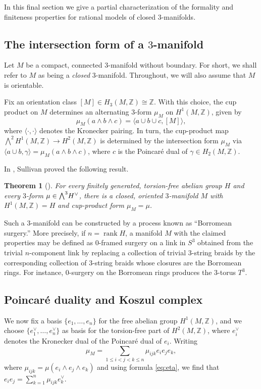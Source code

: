 \documentclass{article}
\numberwithin{equation}{section}
\newtheorem{theorem}{Theorem}[section]
\theoremstyle{definition}
\newcommand{\Z}{\mathbb{Z}}
\DeclareMathOperator{\rank}{rank}
\newcommand{\bwedge}{\mbox{\normalsize $\bigwedge$}}
\begin{document}
In this final section we give a partial characterization of the formality 
and finiteness properties for rational models of closed $3$-manifolds.

\subsection{The intersection form of a $3$-manifold}
\label{subsec:coho 3-mfd}

Let $M$ be a compact, connected $3$-mani\-fold without boundary. 
For short, we shall refer to $M$ as being a {\em closed}\/ $3$-manifold.
Throughout, we will also assume that $M$ is orientable.   

Fix an orientation class $[M]\in H_3(M,\Z)\cong\Z$. With 
this choice, the cup product on $M$ determines an alternating 
$3$-form $\mu_M$ on $H^1(M,\Z)$, given by 
\begin{equation}
\label{eq:eta}
\mu_M(a\wedge b\wedge c) = \langle a\cup b\cup c , [M]\rangle,
\end{equation} 
where $\langle \cdot, \cdot \rangle$ denotes the Kronecker pairing. 
In turn, the cup-product map $\bigwedge^2 H^1(M,\Z) 
\to H^2(M,\Z)$ is determined by the intersection form $\mu_M$ 
via $\langle a\cup b , \gamma \rangle = \mu_M (a\wedge b \wedge c)$, 
where $c$ is the Poincar\'{e} dual of $\gamma \in H_2(M,\Z)$.  

In \cite{Sullivan75}, Sullivan proved the following result.
\begin{theorem}[\cite{Sullivan75}]
\label{thm:sullivan-3m}
For every finitely generated, 
torsion-free abelian group $H$ and every $3$-form $\mu\in \bwedge^3 H^{\vee}$, 
there is a closed, oriented $3$-manifold $M$ with $H^1(M,\Z)=H$ 
and cup-product form $\mu_M=\mu$. 
\end{theorem}

Such a $3$-manifold can be constructed by a process known as ``Borromean surgery.''
More precisely, if $n=\rank H$, a manifold $M$ with the claimed properties 
may be defined as $0$-framed surgery on a link in $S^3$ obtained from the trivial 
$n$-component link by replacing a collection of trivial $3$-string braids by 
the corresponding collection of $3$-string braids whose closures are the Borromean rings. 
For instance, $0$-surgery on the Borromean rings produces the $3$-torus $T^3$. 

\subsection{Poincar\'e duality and Koszul complex}
\label{subsec:koszul 3-mfd} 
We now fix a basis $\{e_1,\dots ,e_n\}$ for the free abelian group 
$H^1(M,\Z)$, and we choose $\{e^{\vee}_1,\dots ,e^{\vee}_n\}$ as basis 
for the torsion-free part of $H^2(M,\Z)$, where $e^{\vee}_i$ 
denotes the Kronecker dual of the Poincar\'e dual of $e_i$. 
Writing  
\begin{equation}
\label{eq:muijk}
\mu_M=\sum_{1\le i<j<k\le n} \mu_{ijk} e_i  e_j  e_k,
\end{equation}
where $\mu_{ijk}=\mu(e_i\wedge e_j\wedge e_k )$ and 
using formula \eqref{eq:eta}, we find that 
$e_i  e_j=\sum_{k=1}^{n} \mu_{ijk}  e^{\vee}_k$.  
\end{document}
